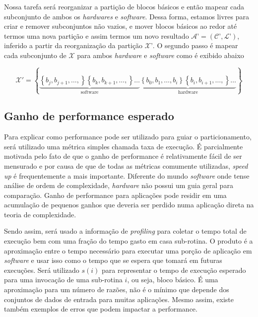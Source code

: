 Nossa tarefa será reorganizar a partição de blocos básicos e então mapear cada subconjunto de ambos os \textit{hardwares} e \textit{software}. Dessa forma, estamos livres para criar e remover subconjuntos não vazios, e mover blocos básicos ao redor até termos uma nova partição e assim termos um novo resultado $ \mathcal{A}’ = (\mathcal{C}’, \mathcal{L}’) $, inferido a partir da reorganização da partição $ \mathcal{X}’ $. O segundo passo é mapear cada subconjunto de $ \mathcal{X} $ para ambos \textit{hardware} e \textit{software} como é exibido abaixo

$$ 
\mathcal{X}'   = \left \{  
\underbrace{\left \{ b_j, b_{j+1}, \dots, \right \}\left \{ b_k, b_{k+1}, \dots, \right \}\dots}_{\text{software}}
\underbrace{\left \{ b_0, b_1, \dots, b_i \right \} \left \{ b_i, b_{i+1}, \dots, \right \}\dots}_{\text{hardware}}
\right \}
$$



\subsection{Ganho de performance esperado}

Para explicar como performance pode ser utilizado para guiar o particionamento, será utilizado uma métrica simples chamada taxa de execução. É parcialmente motivada pelo fato de que o ganho de performance é relativamente fácil de ser mensurado e por causa de que de todas as métricas comumente utilizadas, \textit{speed up} é frequentemente a mais importante. Diferente do mundo \textit{software} onde tense análise de ordem de complexidade, \textit{hardware} não possui um guia geral para comparação. Ganho de performance para aplicações pode residir em uma acumulação de pequenos ganhos que deveria ser perdido numa aplicação direta na teoria de complexidade. 

Sendo assim, será usado a informação de \textit{profiling} para coletar o tempo total de execução bem com uma fração do tempo gasto em casa sub-rotina. O produto é a aproximação entre o tempo necessário para executar uma porção de aplicação em \textit{software} e usar isso como o tempo que se espera que tomará em futuras execuções. Será utilizado $ s(i) $ para representar o tempo de execução esperado para uma invocação de uma sub-rotina $ i $, ou seja, bloco básico. É uma aproximação para um número de razões, não é o mínimo que depende dos conjuntos de dados de entrada para muitas aplicações. Mesmo assim, existe também exemplos de erros que podem impactar a performance.

